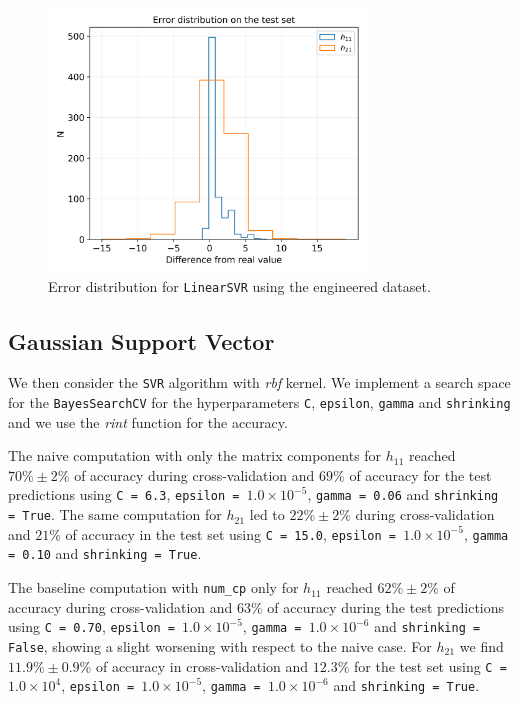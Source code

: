     \begin{figure}[t]
        \centering
        \includegraphics[width=0.75\textwidth]{tex/img/lin_svr_error_eng.png}
        \caption{Error distribution for \texttt{LinearSVR} using the engineered dataset.}
        \label{fig:lin_svr_err}
    \end{figure}
    
\subsection{Gaussian Support Vector}
    We then consider the \texttt{SVR} algorithm with \textit{rbf} kernel. We implement a search space for the \texttt{BayesSearchCV} for the hyperparameters \texttt{C}, \texttt{epsilon}, \texttt{gamma} and \texttt{shrinking} and we use the \textit{rint} function for the accuracy.
    
    The naive computation with only the matrix components for $h_{11}$ reached $70\% \pm 2\%$ of accuracy during cross-validation and $69\%$ of accuracy for the test predictions using \texttt{C = 6.3}, \texttt{epsilon = $1.0 \times 10^{-5}$}, \texttt{gamma = 0.06} and \texttt{shrinking = True}. The same computation for $h_{21}$ led to $22\% \pm 2\%$ during cross-validation and $21\%$ of accuracy in the test set using \texttt{C = 15.0}, \texttt{epsilon = $1.0 \times 10^{-5}$}, \texttt{gamma = 0.10} and \texttt{shrinking = True}.
    
    The baseline computation with \texttt{num\_cp} only for $h_{11}$ reached $62\% \pm 2\%$ of accuracy during cross-validation and $63\%$ of accuracy during the test predictions using \texttt{C = 0.70}, \texttt{epsilon = $1.0 \times 10^{-5}$}, \texttt{gamma = $1.0 \times 10^{-6}$} and \texttt{shrinking = False}, showing a slight worsening with respect to the naive case. For $h_{21}$ we find $11.9\% \pm 0.9\%$ of accuracy in cross-validation and $12.3\%$ for the test set using \texttt{C = $1.0 \times 10^{4}$}, \texttt{epsilon = $1.0 \times 10^{-5}$}, \texttt{gamma = $1.0 \times 10^{-6}$} and \texttt{shrinking = True}.
    
